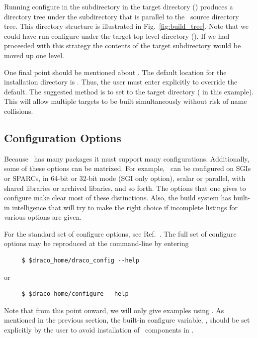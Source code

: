 Running configure in the  subdirectory in the target
directory () produces a directory tree under
the  subdirectory that is parallel to the \draco\ source
directory tree.  This directory structure is illustrated in
Fig.~\ref{fig:build_tree}.  Note that we could have run configure
under the target top-level directory ().  If we had
proceeded with this strategy the contents of the  target
subdirectory would be moved up one level.

One final point should be mentioned about .  The
default location for the installation directory is
.  Thus, the user must enter 
explicitly to override the default.  The suggested method is to set
 to the target directory ( in this
example).  This will allow multiple targets to be built simultaneously 
without risk of name collisions.

\subsection{Configuration Options}
\label{sec:configuration_options}

Because \draco\ has many packages it must support many configurations.
Additionally, some of these options can be matrixed.  For example,
\draco\ can be configured on SGIs or SPARCs, in 64-bit or 32-bit mode
(SGI only option), scalar or parallel, with shared libraries or
archived libaries, and so forth.  The options that one gives to
configure make clear most of these distinctions. Also, the build
system has built-in intelligence that will try to make the right
choice if incomplete listings for various options are given.

For the standard set of configure options, see Ref.~\cite{autoconf}.
The full set of configure options may be reproduced at the
command-line by entering
\begin{verbatim}
     $ $draco_home/draco_config --help
\end{verbatim}
or 
\begin{verbatim}
     $ $draco_home/configure --help
\end{verbatim}
Note that from this point onward, we will only give examples using
\dracoconf.  As mentioned in the previous section, the built-in
configure variable, , should be set explicitly by the
user to avoid installation of \draco\ components in
.

